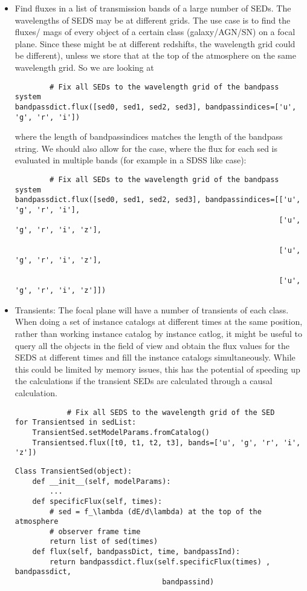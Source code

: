 \documentclass{article}[12pt]
\begin{document}
\begin{itemize}
    \item Find fluxes in a list of transmission bands of a large number of SEDs. The wavelengths of SEDS may be at different grids. The use case is to find the fluxes/ mags of every object of a certain class (galaxy/AGN/SN) on a focal plane. Since these might be at different redshifts, the wavelength grid could be different), unless we store that at the top of the atmosphere on the same wavelength grid.
        So we are looking at 
    \begin{verbatim}
        # Fix all SEDs to the wavelength grid of the bandpass system
bandpassdict.flux([sed0, sed1, sed2, sed3], bandpassindices=['u', 'g', 'r', 'i'])
    \end{verbatim}
where the length of bandpassindices matches the length of the bandpass string.
We should also allow for the case, where the flux for each sed is evaluated in
multiple bands (for example in a SDSS like case):
    \begin{verbatim}
        # Fix all SEDs to the wavelength grid of the bandpass system
bandpassdict.flux([sed0, sed1, sed2, sed3], bandpassindices=[['u', 'g', 'r', 'i'],
                                                             ['u', 'g', 'r', 'i', 'z'],

                                                             ['u', 'g', 'r', 'i', 'z'],

                                                             ['u', 'g', 'r', 'i', 'z']])
    \end{verbatim}
    \item Transients: The focal plane will have a number of transients of each class. When doing a set of instance catalogs at different times at the same position, rather than working instance catalog by instance catlog, it might be useful to query all the objects in the field of view and obtain the flux values for the SEDS at different times and fill the instance catalogs simultaneously. While this could be limited by memory issues, this has the potential of speeding up the calculations if the transient SEDs are calculated through a causal calculation.
        \begin{verbatim}
            # Fix all SEDS to the wavelength grid of the SED
for Transientsed in sedList:
    TransientSed.setModelParams.fromCatalog()
    Transientsed.flux([t0, t1, t2, t3], bands=['u', 'g', 'r', 'i', 'z'])
        \end{verbatim}
        \begin{verbatim}
Class TransientSed(object):
    def __init__(self, modelParams):
        ...
    def specificFlux(self, times):
        # sed = f_\lambda (dE/d\lambda) at the top of the atmosphere
        # observer frame time
        return list of sed(times)
    def flux(self, bandpassDict, time, bandpassInd):
        return bandpassdict.flux(self.specificFlux(times) , bandpassdict,
                                  bandpassind)
        \end{verbatim}


\end{itemize}
\end{document}
